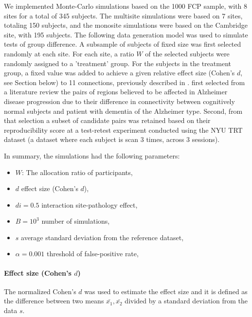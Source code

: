 \documentclass[authoryear]{elsarticle}
\begin{document}
We implemented Monte-Carlo simulations based on the 1000 FCP sample, with 8 sites for a total of 345 subjects. The multisite simulations were based on 7 sites, totaling 150 subjects, and the monosite simulations were based on the Cambridge site, with 195 subjects. The following data generation model was used to simulate tests of group difference. A subsample of subjects of fixed size was first selected randomly at each site. For each site, a ratio $W$ of the selected subjects were randomly assigned to a 'treatment' group. For the subjects in the treatment group, a fixed value was added to achieve a given relative effect size (Cohen's $d$, see Section below) to 11 connections, previously described in \cite{Orban2015}. \cite{Orban2015} first selected from a literature review the pairs of regions believed to be affected in Alzheimer disease progression due to their difference in connectivity between cognitively normal subjects and patient with dementia of the Alzheimer type. Second, from that selection a subset of candidate pairs was retained based on their reproducibility score at a test-retest experiment conducted using the NYU TRT dataset \citep{Zuo2010} (a dataset where each subject is scan 3 times, across 3 sessions).  

In summary, the simulations had the following parameters:

\begin{itemize}
 \item $W$: The allocation ratio of participants,
 \item $d$ effect size (Cohen’s $d$),
 \item $di=0.5$ interaction site-pathology effect,
 \item $B=10^3$ number of simulations,
 \item $s$ average standard deviation from the reference dataset,
 \item $\alpha=0.001$ threshold of false-positive rate,
\end{itemize}


\paragraph{Effect size (Cohen's $d$)}
The normalized Cohen's $d$ was used to estimate the effect size and it is defined as the difference between two means $\bar{x_{1}},\bar{x_{2}}$ divided by a standard deviation from the data $s$.
\end{document}
